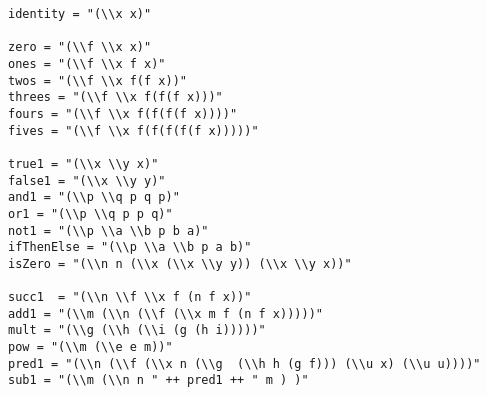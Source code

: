 \documentclass[11pt]{article}
\begin{document}
\begin{verbatim}
identity = "(\\x x)"

zero = "(\\f \\x x)"
ones = "(\\f \\x f x)"
twos = "(\\f \\x f(f x))"
threes = "(\\f \\x f(f(f x)))"
fours = "(\\f \\x f(f(f(f x))))"
fives = "(\\f \\x f(f(f(f(f x)))))"

true1 = "(\\x \\y x)"
false1 = "(\\x \\y y)"
and1 = "(\\p \\q p q p)"
or1 = "(\\p \\q p p q)"
not1 = "(\\p \\a \\b p b a)"
ifThenElse = "(\\p \\a \\b p a b)"
isZero = "(\\n n (\\x (\\x \\y y)) (\\x \\y x))"

succ1  = "(\\n \\f \\x f (n f x))"
add1 = "(\\m (\\n (\\f (\\x m f (n f x)))))"
mult = "(\\g (\\h (\\i (g (h i)))))"
pow = "(\\m (\\e e m))"
pred1 = "(\\n (\\f (\\x n (\\g  (\\h h (g f))) (\\u x) (\\u u))))"
sub1 = "(\\m (\\n n " ++ pred1 ++ " m ) )"


\end{verbatim}
\end{document}
